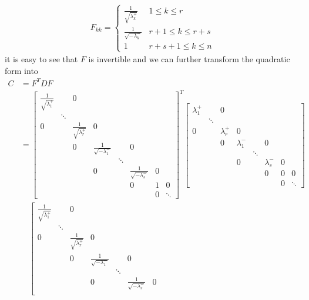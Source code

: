 \begin{align}
F_{kk} = 
\begin{cases}
\frac{1}{\sqrt{\lambda_{k}^+}} & 1 \leq k \leq r \\
\frac{1}{\sqrt{-\lambda_{k}^-}} & r+1 \leq k \leq r+s \\
1 & r+s+1 \leq k \leq n
\end{cases}
\end{align}
it is easy to see that $F$ is invertible and we can further transform the quadratic form into
\begin{align*}
C &= F^TDF \\
&= \left[\begin{smallmatrix}
\frac{1}{\sqrt{\lambda_{1}^+}} & & 0 & & & & &\\
 & \ddots & & & & & & \\
0 & & \frac{1}{\sqrt{\lambda_{r}^+}} & 0 & & & &\\
 & & 0 & \frac{1}{\sqrt{-\lambda_{1}^-}} & & 0 & & \\
 & & & & \ddots & & & \\
 & & & 0 & & \frac{1}{\sqrt{-\lambda_{s}^-}} & 0 &  \\
 & & & & & 0 & 1 & 0\\
 & & & & & & 0 & \ddots
\end{smallmatrix}\right]^T
\left[\begin{smallmatrix}
\lambda_1^+ & & 0 & & & & &\\
 & \ddots & & & & & & \\
0 & & \lambda_{r}^+ & 0 & & & &\\
 & & 0 & \lambda_{1}^- & & 0 & & \\
 & & & & \ddots & & & \\
 & & & 0 & & \lambda_{s}^- & 0 &  \\
 & & & & & 0 & 0 & 0\\
 & & & & & & 0 & \ddots
\end{smallmatrix}\right] \\
& \quad \left[\begin{smallmatrix}
\frac{1}{\sqrt{\lambda_{1}^+}} & & 0 & & & & &\\
 & \ddots & & & & & & \\
0 & & \frac{1}{\sqrt{\lambda_{r}^+}} & 0 & & & &\\
 & & 0 & \frac{1}{\sqrt{-\lambda_{1}^-}} & & 0 & & \\
 & & & & \ddots & & & \\
 & & & 0 & & \frac{1}{\sqrt{-\lambda_{s}^-}} & 0 &  \\

\end{smallmatrix}
\end{align*}
